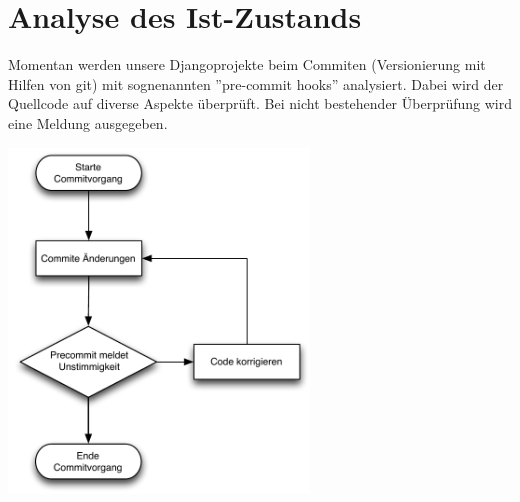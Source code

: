 \section{Analyse des Ist-Zustands}
Momentan werden unsere Djangoprojekte beim Commiten (Versionierung mit Hilfen von git) mit sognenannten ''pre-commit hooks'' analysiert. 
Dabei wird der Quellcode auf diverse Aspekte überprüft. Bei nicht bestehender Überprüfung wird eine Meldung ausgegeben.\\

\begin{center}
\includegraphics[width=0.6\textwidth,angle=0]{./grafiken/pzd_projektabarbeitung_ist.pdf}
\end{center}

